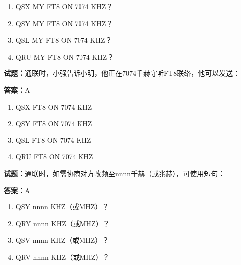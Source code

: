 \documentclass{ctexbook}
\begin{document}
\begin{enumerate}[leftmargin=3em]
  \item QSX MY FT8 ON 7074 KHZ？ 


  \item QSY MY FT8 ON 7074 KHZ？ 

  \item QSL MY FT8 ON 7074 KHZ？ 

  \item QRU MY FT8 ON 7074 KHZ？ 

\end{enumerate}





\vspace{1em}

\textbf{试题：}通联时，小强告诉小明，他正在7074千赫守听FT8联络，他可以发送： 

\textbf{答案：}A 

\begin{enumerate}[leftmargin=3em]
  \item QSX FT8 ON 7074 KHZ 

  \item QSY FT8 ON 7074 KHZ 

  \item QSL FT8 ON 7074 KHZ 

  \item QRU FT8 ON 7074 KHZ 

\end{enumerate}





\vspace{1em}

\textbf{试题：}通联时，如需协商对方改频至nnnn千赫（或兆赫），可使用短句： 

\textbf{答案：}A 

\begin{enumerate}[leftmargin=3em]
  \item QSY nnnn KHZ（或MHZ）？ 

  \item QRY nnnn KHZ（或MHZ）？ 

  \item QSV nnnn KHZ（或MHZ）？ 

  \item QRV nnnn KHZ（或MHZ）？ 

\end{enumerate}
\end{document}
